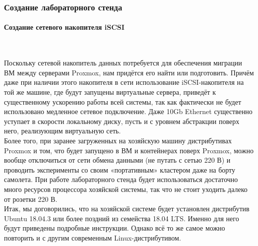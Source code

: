 \documentclass[14pt, a4paper]{article}
\begin{document}
\subsubsection*{Создание лабораторного стенда} 

\paragraph*{Создание сетевого накопителя iSCSI} \mbox{}\\

Поскольку сетевой накопитель данных потребуется для обеспечения миграции ВМ между серверами
Proxmox, нам придётся его найти или подготовить. Причём даже при наличии этого накопителя в сети
использование iSCSI-накопителя на той же машине, где будут запущены виртуальные сервера,
приведёт к существенному ускорению работы всей системы, так как фактически не будет
использовано медленное сетевое подключение. Даже 10Gb Ethernet существенно уступает в скорости
локальному диску, пусть и с уровнем абстракции поверх него, реализующим виртуальную сеть.\\

Более того, при заранее загруженных на хозяйскую машину дистрибутивах Proxmox и том, что будет
запущено в ВМ и контейнерах поверх Proxmox, можно вообще отключиться от сети обмена данными
(не путать с сетью 220 В) и проводить эксперименты со своим «портативным» кластером даже на
борту самолета. При работе лабораторного стенда будет использоваться достаточно много ресурсов
процессора хозяйской системы, так что не стоит уходить далеко от розетки 220 В.\\

Итак, мы договорились, что на хозяйской системе будет установлен дистрибутив Ubuntu 18.04.3 или
более поздний из семейства 18.04 LTS. Именно для него будут приведены подробные инструкции.
Однако всё то же самое можно повторить и с другим современным Linux-дистрибутивом.\\
\end{document}
